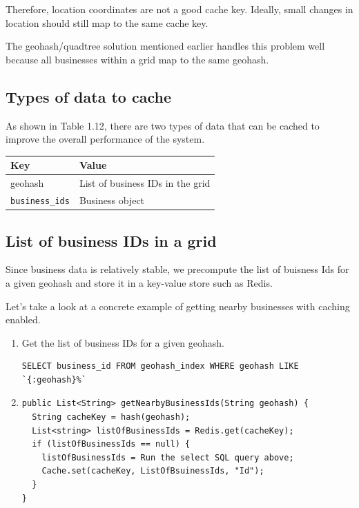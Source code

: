 \documentclass{report}
\theoremstyle{definition}
\let\oldsubsection\subsection
\renewcommand{\subsection}{\oldsubsection*}
\begin{document}
Therefore, location coordinates are not a good cache key. Ideally, small changes in location should still map to the same cache key.

The geohash/quadtree solution mentioned earlier handles this problem well because all businesses within a grid map to the same geohash.

\subsection{Types of data to cache}

As shown in Table 1.12, there are two types of data that can be cached to improve the overall performance of the system.

\begin{tabular}{|p{6cm}|p{6cm}|}
\hline
Key & Value \\
\hline
geohash & List of business IDs in the grid \\
\hline
\lstinline|business_ids| & Business object \\
\hline
\end{tabular}

\subsection{List of business IDs in a grid}

Since business data is relatively stable, we precompute the list of buisness Ids for a given geohash and store it in a key-value store such as Redis.

Let's take a look at a concrete example of getting nearby businesses with caching enabled.

\begin{enumerate}
\item
Get the list of business IDs for a given geohash.

\begin{lstlisting}
SELECT business_id FROM geohash_index WHERE geohash LIKE `{:geohash}%`
\end{lstlisting}

\item

\begin{lstlisting}
public List<String> getNearbyBusinessIds(String geohash) {
  String cacheKey = hash(geohash);
  List<string> listOfBusinessIds = Redis.get(cacheKey);
  if (listOfBusinessIds == null) {
    listOfBusinessIds = Run the select SQL query above;
    Cache.set(cacheKey, ListOfBsuinessIds, "Id");
  }
}
\end{lstlisting}
\end{enumerate}
\end{document}
